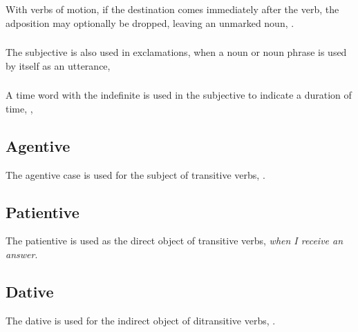 \subsubsection{} With verbs of motion, if the destination comes
immediately after the verb, the adposition  may optionally be
dropped, leaving an unmarked noun,  . \label{syn:subjective:ne}

\subsubsection{} The subjective is also used in exclamations, when a
noun or noun phrase is used by itself as an utterance,  
 

\subsubsection{} A time word with the indefinite  is used in the
subjective to indicate a duration of time,  ,  

\subsection{Agentive} The agentive case is used for the subject of
transitive verbs,  .

\subsection{Patientive} The patientive is used as the direct object of
transitive verbs, 
\textit{when I receive an answer}.

\subsection{Dative} The dative is used for the indirect object of
ditransitive verbs,  .

